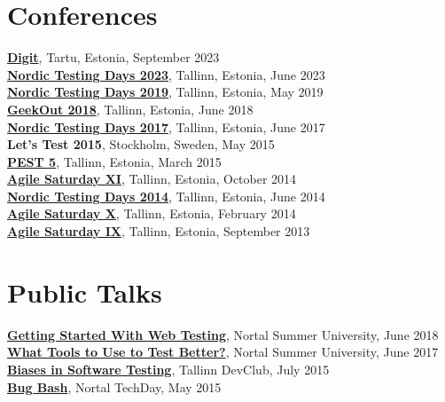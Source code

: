 \documentclass[a4paper, 12pt]{article}
\begin{document}
\section{Conferences}

\textbf{\href{https://digit.dev/}{Digit}}, Tartu, Estonia, September 2023\\
\textbf{\href{https://nordictestingdays.eu/}{Nordic Testing Days 2023}}, Tallinn, Estonia, June 2023\\
\textbf{\href{https://nordictestingdays.eu/2019-2/}{Nordic Testing Days 2019}}, Tallinn, Estonia, May 2019\\
\textbf{\href{https://2018.geekout.ee/}{GeekOut 2018}}, Tallinn, Estonia, June 2018\\
\textbf{\href{https://nordictestingdays.eu/2017-2/}{Nordic Testing Days 2017}}, Tallinn, Estonia, June 2017\\
\textbf{Let's Test 2015}, Stockholm, Sweden, May 2015\\
\textbf{\href{https://kristjanuba.wordpress.com/2014/09/27/pest5-testing-craft-social-or-technical/}{PEST 5}}, Tallinn, Estonia, March 2015\\
\textbf{\href{http://agile.ee/2014/agile-saturday-xi/}{Agile Saturday XI}}, Tallinn, Estonia, October 2014\\
\textbf{\href{https://nordictestingdays.eu/2014-2/}{Nordic Testing Days 2014}}, Tallinn, Estonia, June 2014\\
\textbf{\href{http://agile.ee/2014/agile-saturday-x/}{Agile Saturday X}}, Tallinn, Estonia, February 2014\\
\textbf{\href{http://agile.ee/agile-saturday/agile-saturday-ix/}{Agile Saturday IX}}, Tallinn, Estonia, September 2013

\section{Public Talks}

\textbf{\href{https://ivanova-irina.blogspot.com/2018/07/nortal-summer-university-workshop.html}{Getting Started With Web Testing}}, Nortal Summer University, June 2018\\
\textbf{\href{https://ivanova-irina.blogspot.com/2017/06/nortal-summer-university-workshop-about.html}{What Tools to Use to Test Better?}}, Nortal Summer University, June 2017\\
\textbf{\href{https://ivanova-irina.blogspot.com/2015/07/presentation-in-devclub-about-biases-in.html}{Biases in Software Testing}}, Tallinn DevClub, July 2015\\
\textbf{\href{https://ivanova-irina.blogspot.com/2015/06/my-first-ever-workshop-at-nortal.html}{Bug Bash}}, Nortal TechDay, May 2015
\end{document}
